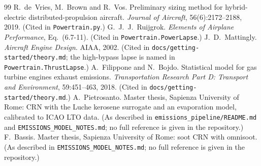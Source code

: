 \documentclass[a4paper,11pt]{article}
\begin{document}
\begin{thebibliography}{99}\small
{} R.~de~Vries, M.~Brown and R.~Vos. Preliminary sizing method for
  hybrid-electric distributed-propulsion aircraft. \emph{Journal of Aircraft}, 56(6):2172--2188,
  2019. (Cited in \texttt{Powertrain.py}.)
 G.~J.~J.~Ruijgrok. \emph{Elements of Airplane Performance}, Eq.~(6.7-11).
  (Cited in \texttt{Powertrain.PowerLapse}.)
 J.~D.~Mattingly. \emph{Aircraft Engine Design}. AIAA, 2002. (Cited in
  \texttt{docs/getting-started/theory.md}; the high-bypass lapse is named in
  \texttt{Powertrain.ThrustLapse}.)
 A.~Filippone and N.~Bojdo. Statistical model for gas turbine engines
  exhaust emissions. \emph{Transportation Research Part D: Transport and Environment},
  59:451--463, 2018. (Cited in \texttt{docs/getting-started/theory.md}.)
 A.~Pietrosanto. Master thesis, Sapienza University of Rome: CRN with the
  Luche kerosene surrogate and an evaporation model, calibrated to ICAO LTO data. (As described
  in \texttt{emissions\_pipeline/README.md} and \texttt{EMISSIONS\_MODEL\_NOTES.md}; no full
  reference is given in the repository.)
 F.~Bassis. Master thesis, Sapienza University of Rome: soot CRN with omnisoot.
  (As described in \texttt{EMISSIONS\_MODEL\_NOTES.md}; no full reference is given in the
  repository.)
\end{thebibliography}
\end{document}
